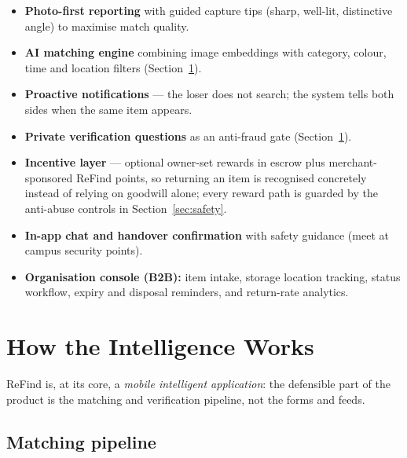 \documentclass[11pt,a4paper]{article}
\begin{document}
\begin{itemize}
  \item \textbf{Photo-first reporting} with guided capture tips (sharp, well-lit,
        distinctive angle) to maximise match quality.
  \item \textbf{AI matching engine} combining image embeddings with category, colour, time
        and location filters (Section~\ref{sec:ai}).
  \item \textbf{Proactive notifications} --- the loser does not search; the system tells
        both sides when the same item appears.
  \item \textbf{Private verification questions} as an anti-fraud gate (Section~\ref{sec:ai}).
  \item \textbf{Incentive layer} --- optional owner-set rewards in escrow plus
        merchant-sponsored ReFind points, so returning an item is recognised concretely
        instead of relying on goodwill alone; every reward path is guarded by the
        anti-abuse controls in Section~\ref{sec:safety}.
  \item \textbf{In-app chat and handover confirmation} with safety guidance (meet at campus
        security points).
  \item \textbf{Organisation console (B2B):} item intake, storage location tracking, status
        workflow, expiry and disposal reminders, and return-rate analytics.
\end{itemize}

\section{How the Intelligence Works}
\label{sec:ai}

ReFind is, at its core, a \emph{mobile intelligent application}: the defensible part of the
product is the matching and verification pipeline, not the forms and feeds.

\subsection{Matching pipeline}
\end{document}
